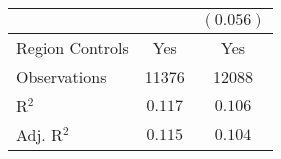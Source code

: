 \begin{center}
\begin{tiny}
\begin{longtable}{l@{} c@{} c@{}}
                                                                           &                  & $(0.056)$        \\
\hline
Region Controls                                                            & Yes              & Yes              \\
Observations                                                               & 11376            & 12088            \\
R$^2$                                                                      & $0.117$          & $0.106$          \\
Adj. R$^2$                                                                 & $0.115$          & $0.104$          \\
\end{longtable}
\end{tiny}
\end{center}
